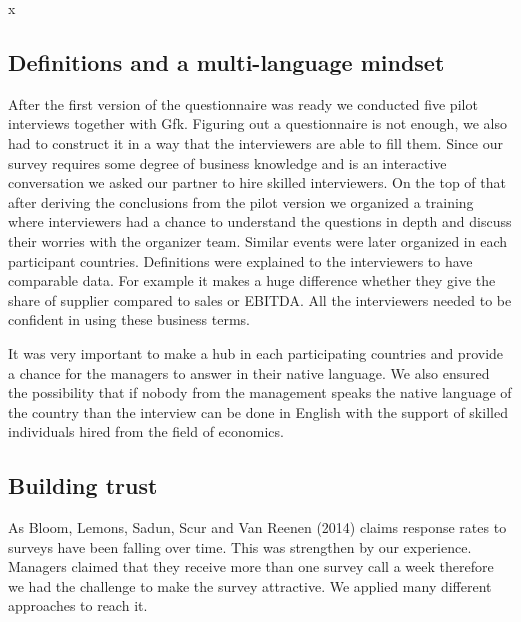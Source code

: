 x\documentclass[final, dvipsnames, authoryear,12pt]{elsarticle}
\begin{document}
\subsection{Definitions and a multi-language mindset}

After the first version of the questionnaire was ready we conducted five pilot interviews together with Gfk. Figuring out a questionnaire is not enough, we also had to construct it in a way that the interviewers are able to fill them. Since our survey requires some degree of business knowledge and is an interactive conversation we asked our partner to hire skilled interviewers. On the top of that after deriving the conclusions from the pilot version we organized a training where interviewers had a chance to understand the questions in depth and discuss their worries with the organizer team. Similar events were later organized in each participant countries. Definitions were explained to the interviewers to have comparable data. For example it makes a huge difference whether they give the share of supplier compared to sales or EBITDA. All the interviewers needed to be confident in using these business terms.

It was very important to make a hub in each participating countries and provide a chance for the managers to answer in their native language. We also ensured the possibility that if nobody from the management speaks the native language of the country than the interview can be done in English with the support of skilled individuals hired from the field of economics.

\subsection{Building trust}

As Bloom, Lemons, Sadun, Scur and Van Reenen (2014) claims response rates to surveys have been falling over time. This was strengthen by our experience. Managers claimed that they receive more than one survey call a week therefore we had the challenge to make the survey attractive. We applied many different approaches to reach it.
\end{document}
